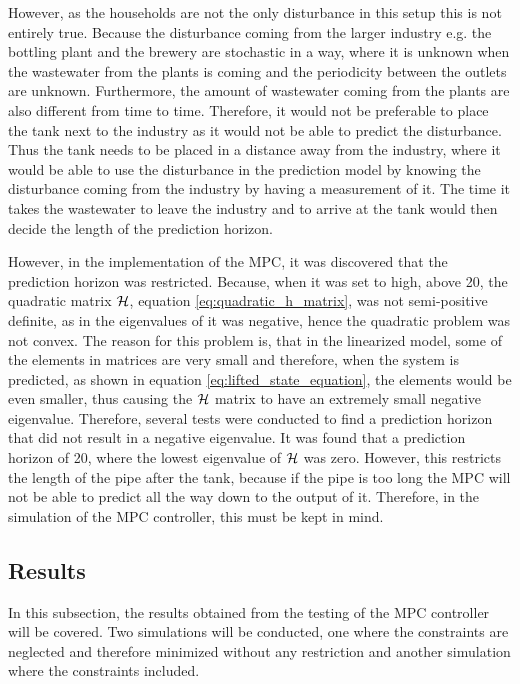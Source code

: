 However, as the households are not the only disturbance in this setup this is not entirely true. Because the disturbance coming from the larger industry e.g. the bottling plant and the brewery are stochastic in a way, where it is unknown when the wastewater from the plants is coming and the periodicity between the outlets are unknown. Furthermore, the amount of wastewater coming from the plants are also different from time to time. Therefore, it would not be preferable to place the tank next to the industry as it would not be able to predict the disturbance. Thus the tank needs to be placed in a distance away from the industry, where it would be able to use the disturbance in the prediction model by knowing the disturbance coming from the industry by having a measurement of it. The time it takes the wastewater to leave the industry and to arrive at the tank would then decide the length of the prediction horizon. 

However, in the implementation of the MPC, it was discovered that the prediction horizon was restricted. Because, when it was set to high, above 20, the quadratic matrix $\CMcal{H}$, equation \ref{eq:quadratic_h_matrix}, was not semi-positive definite, as in the eigenvalues of it was negative, hence the quadratic problem was not convex. The reason for this problem is, that in the linearized model, some of the elements in matrices are very small and therefore, when the system is predicted, as shown in equation \ref{eq:lifted_state_equation}, the elements would be even smaller, thus causing the $\CMcal{H}$ matrix to have an extremely small negative eigenvalue.  Therefore, several tests were conducted to find a prediction horizon that did not result in a negative eigenvalue. It was found that a prediction horizon of 20, where the lowest eigenvalue of $\CMcal{H}$ was zero. However, this restricts the length of the pipe after the tank, because if the pipe is too long the MPC will not be able to predict all the way down to the output of it. Therefore, in the simulation of the MPC controller, this must be kept in mind.   

\subsection*{Results}
In this subsection, the results obtained from the testing of the MPC controller will be covered. Two simulations will be conducted, one where the constraints are neglected and therefore minimized without any restriction and another simulation where the constraints included. 

